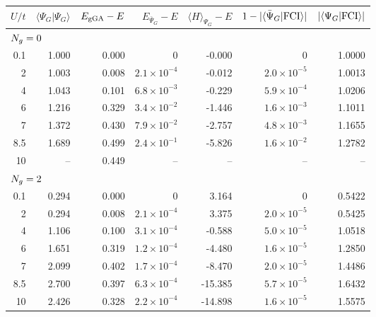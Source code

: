 \begin{tabular}{r rrrrrr}
\toprule
$U/t$ & $\langle\Psi_G|\Psi_G\rangle$ & $E_{\rm gGA}-E$ & $E_{\bar\Psi_G}-E$ & $\langle H\rangle_{\Psi_G}-E$ & $1-|\langle\bar\Psi_G|{\rm FCI}\rangle|$ & $|\langle\Psi_G|{\rm FCI}\rangle|$\\
\midrule
\multicolumn{7}{l}{$N_{g}=0$}\\
0.1 & 1.000 & 0.000 & 0 & -0.000 & 0 & 1.0000\\
2 & 1.003 & 0.008 & $2.1\!\times\!10^{-4}$ & -0.012 & $2.0\!\times\!10^{-5}$ & 1.0013\\
4 & 1.043 & 0.101 & $6.8\!\times\!10^{-3}$ & -0.229 & $5.9\!\times\!10^{-4}$ & 1.0206\\
6 & 1.216 & 0.329 & $3.4\!\times\!10^{-2}$ & -1.446 & $1.6\!\times\!10^{-3}$ & 1.1011\\
7 & 1.372 & 0.430 & $7.9\!\times\!10^{-2}$ & -2.757 & $4.8\!\times\!10^{-3}$ & 1.1655\\
8.5 & 1.689 & 0.499 & $2.4\!\times\!10^{-1}$ & -5.826 & $1.6\!\times\!10^{-2}$ & 1.2782\\
10 & -- & 0.449 & -- & -- & -- & --\\
\midrule
\multicolumn{7}{l}{$N_{g}=2$}\\
0.1 & 0.294 & 0.000 & 0 & 3.164 & 0 & 0.5422\\
2 & 0.294 & 0.008 & $2.1\!\times\!10^{-4}$ & 3.375 & $2.0\!\times\!10^{-5}$ & 0.5425\\
4 & 1.106 & 0.100 & $3.1\!\times\!10^{-4}$ & -0.588 & $5.0\!\times\!10^{-5}$ & 1.0518\\
6 & 1.651 & 0.319 & $1.2\!\times\!10^{-4}$ & -4.480 & $1.6\!\times\!10^{-5}$ & 1.2850\\
7 & 2.099 & 0.402 & $1.7\!\times\!10^{-4}$ & -8.470 & $2.0\!\times\!10^{-5}$ & 1.4486\\
8.5 & 2.700 & 0.397 & $6.3\!\times\!10^{-4}$ & -15.385 & $5.7\!\times\!10^{-5}$ & 1.6432\\
10 & 2.426 & 0.328 & $2.2\!\times\!10^{-4}$ & -14.898 & $1.6\!\times\!10^{-5}$ & 1.5575\\
\bottomrule
\end{tabular}
